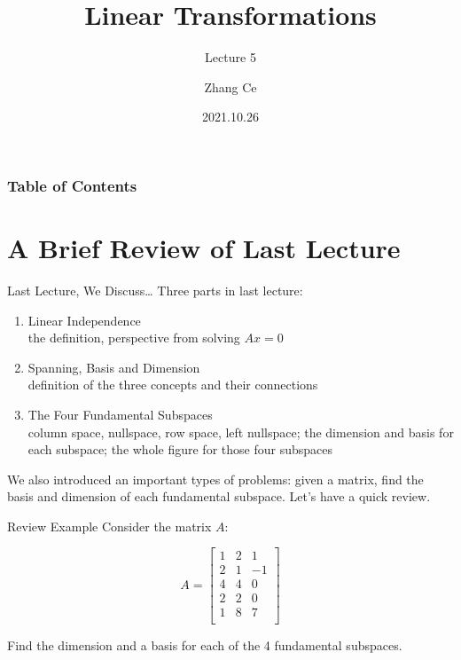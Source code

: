 \documentclass{beamer}
\title[Linear Algebra] %
{Linear Transformations}
\subtitle{Lecture 5}
\author[11910803@mail.sustech.edu.cn] %
{
    Zhang Ce
}
\institute[] %
{
    Department of Electrical and Electronic Engineering\\
    Southern University of Science and Technology
}
\date[2021.10.26] %
{2021.10.26}
\begin{document}
\frame{\titlepage}


\begin{frame}
\frametitle{Table of Contents}
\tableofcontents
\end{frame}
\section{A Brief Review of Last Lecture}
\begin{frame}{Last Lecture, We Discuss\dots}
Three parts in last lecture:
    \begin{enumerate}
        \item Linear Independence\\
        the definition, perspective from solving $Ax=0$
        \item Spanning, Basis and Dimension\\
        definition of the three concepts and their connections
        \item The Four Fundamental Subspaces\\
        column space, nullspace, row space, left nullspace; the dimension and basis for each subspace; the whole figure for those four subspaces
    \end{enumerate}

We also introduced an important types of problems: given a matrix, find the basis and dimension of each fundamental subspace. Let's have a quick review.
\end{frame}

\begin{frame}{Review Example}
Consider the matrix $A$:

\begin{equation*}
    A=\left[ \begin{matrix}
        1&		2&		1\\
        2&		1&		-1\\
        4&		4&		0\\
        2&		2&		0\\
        1&		8&		7\\
    \end{matrix} \right]
\end{equation*}

\vspace{3pt}
Find the dimension and a basis for each of the 4 fundamental subspaces.

\end{frame}
\end{document}

